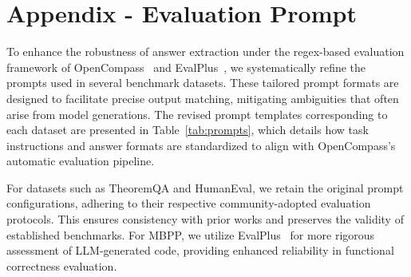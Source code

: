 \documentclass{article}
\begin{document}
\section{Appendix - Evaluation Prompt}
To enhance the robustness of answer extraction under the regex-based evaluation framework of OpenCompass~\cite{contributors2023opencompass} and EvalPlus~\cite{evalplus}, we systematically refine the prompts used in several benchmark datasets. These tailored prompt formats are designed to facilitate precise output matching, mitigating ambiguities that often arise from model generations. The revised prompt templates corresponding to each dataset are presented in Table~\ref{tab:prompts}, which details how task instructions and answer formats are standardized to align with OpenCompass's automatic evaluation pipeline.

For datasets such as TheoremQA and HumanEval, we retain the original prompt configurations, adhering to their respective community-adopted evaluation protocols. This ensures consistency with prior works and preserves the validity of established benchmarks.
% 
For MBPP, we utilize EvalPlus~\cite{evalplus} for more rigorous assessment of LLM-generated code, providing enhanced reliability in functional correctness evaluation.

\end{document}
